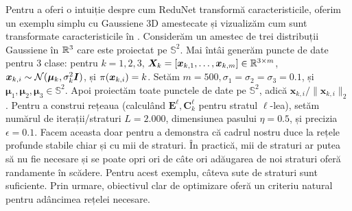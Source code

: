 \documentclass[../../book-main_ro.tex]{subfiles}
\begin{document}
\begin{example}
Pentru a oferi o intuiție despre cum ReduNet transformă caracteristicile, oferim un exemplu simplu cu Gaussiene 3D amestecate și vizualizăm cum sunt transformate caracteristicile în . 
Considerăm un amestec de trei distribuții Gaussiene în $\mathbb{R}^{3}$ care este proiectat pe $\mathbb{S}^2$. Mai întâi generăm puncte de date pentru 3 clase: pentru $k=1,2,3$, $\bm{X}_{k}=[\bm{x}_{k,1}, \ldots, \bm{x}_{k,m}] \in \mathbb{R}^{3\times m}$, $\bm{x}_{k,i} \sim \mathcal{N}(\bm{\mu}_{k}, \sigma_{k}^{2} \bm{I})$, și ${\pi}(\bm{x}_{k,i}) = k$.
Setăm $m=500, \sigma_{1}=\sigma_{2}=\sigma_{3}=0.1$, și $\bm{\mu}_{1}, \bm{\mu}_{2}, \bm{\mu}_{3} \in \mathbb{S}^2$. 
Apoi proiectăm toate punctele de date pe $\mathbb{S}^{2}$, adică $\bm{x}_{k,i}/\|\bm{x}_{k,i}\|_{2}$. 
Pentru a construi rețeaua (calculând $\bm{E}^{\ell}, \bm{C}^{\ell}_{k}$ pentru stratul $\ell$-lea), setăm numărul de iterații/straturi $L=2.000$, dimensiunea pasului $\eta=0.5$, și precizia $\epsilon=0.1$. 
Facem aceasta doar pentru a demonstra că cadrul nostru duce la rețele profunde stabile chiar și cu mii de straturi. 
În practică, mii de straturi ar putea să nu fie necesare și se poate opri ori de câte ori adăugarea de noi straturi oferă randamente în scădere. 
Pentru acest exemplu, câteva sute de straturi sunt suficiente. Prin urmare, obiectivul clar de optimizare oferă un criteriu natural pentru adâncimea rețelei necesare.


\end{example}
\end{document}
